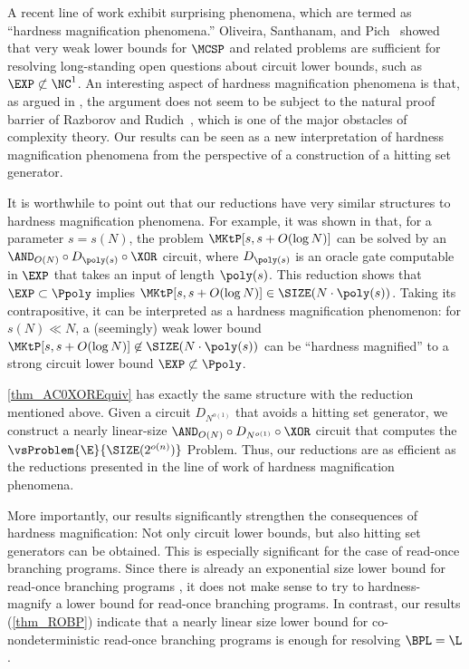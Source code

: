 \documentclass{toc}
\begin{document}
A recent line of work \cite{OliveiraS18_focs_conf, OliveiraPS19_coco_conf, McKayMW19_stoc_conf, ChenJW19_focs_conf, ChenHOPRS20_innovations_conf} exhibit surprising phenomena, which are termed as ``hardness magnification phenomena.''
Oliveira, Santhanam, and Pich~\cite{OliveiraS18_focs_conf,OliveiraPS19_coco_conf}
showed that
very weak lower bounds for $\MCSP$ and related problems
are sufficient for resolving
long-standing open questions
about circuit lower bounds, such as $\EXP \not\subset \NC^1$.
An interesting aspect of hardness magnification phenomena is that,
as argued in \cite{AllenderK10_jacm_journals, OliveiraS18_focs_conf},
the argument does not seem to be subject to the natural proof barrier of Razborov and Rudich~\cite{RazborovR97_jcss_journals},
which is one of the major obstacles of complexity theory.
Our results can be seen as a new interpretation of hardness magnification phenomena
from the perspective of
a construction of a hitting set generator.

It is worthwhile to point out that our reductions have very similar structures
to hardness magnification phenomena.
For example, it was shown in \cite{OliveiraS18_focs_conf, OliveiraPS19_coco_conf} that, for a parameter $s = s(N)$,
the problem $\MKtP[s, s + O(\log N)]$
can be solved by
an $\AND_{O(N)} \circ D_{\poly(s)} \circ \XOR$ circuit,
where $D_{\poly(s)}$ is an oracle gate computable in $\EXP$ that takes an input of length $\poly(s)$.
This reduction shows that
$\EXP \subset \Ppoly$ implies $\MKtP[s, s + O(\log N)] \in \SIZE(N \cdot \poly(s))$.
Taking its contrapositive,
it can be interpreted as a hardness magnification phenomenon:
for $s(N) \ll N$, a (seemingly) weak lower bound $\MKtP[s, s + O(\log N)] \not\in \SIZE(N \cdot \poly(s))$
can be ``hardness magnified'' to
a strong circuit lower bound $\EXP \not\subset \Ppoly$.

\cref{thm_AC0XOREquiv} has exactly the same structure with the reduction mentioned above.
Given a circuit $D_{N^{o(1)}}$ that avoids a hitting set generator,
we construct a nearly linear-size $\AND_{O(N)} \circ D_{N^{o(1)}} \circ \XOR$ circuit that computes
the $\vsProblem{\E}{\SIZE(2^{o(n)})}$ Problem.
Thus, our reductions are as efficient as the reductions presented
in the line of work of hardness magnification phenomena.

More importantly, our results significantly strengthen the consequences of hardness magnification:
Not only circuit lower bounds, but also hitting set generators can be obtained.
This is especially significant for the case of read-once branching programs.
Since
there is already an exponential size lower bound
for read-once branching programs \cite{BorodinRS93_cc_journals},
it does not make sense to try to hardness-magnify
a lower bound for read-once branching programs.
In contrast,
our results (\cref{thm_ROBP})
indicate that
a nearly linear size lower bound for co-nondeterministic read-once branching programs
is enough for resolving $\BPL = \L$.
\end{document}

